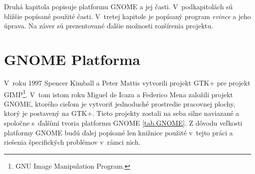\documentclass[12pt,oneside,final]{fithesis2}
\begin{document}
Druhá kapitola popisuje platformu GNOME a jej časti. V~podkapitolách sú bližšie popísané použité časti. V~tretej kapitole je popísaný program \emph{evince} a jeho úprava. Na záver sú prezentované ďalšie možnosti rozšírenia projektu.

\chapter{GNOME Platforma}
V~roku 1997 Spencer Kimball a Peter Mattis vytvorili projekt GTK+ pre projekt GIMP\footnote{GNU Image Manipulation Program.}. V~tom istom roku Miguel de Icaza a Federico Mena založili projekt GNOME, ktorého cieľom je vytvoriť jednoduché prostredie pracovnej plochy, ktorý je postavený na GTK+. Tieto projekty zostali na seba silne naviazané a spoločne s~ďalšími tvoria platformu GNOME \ref{tab.GNOME}. Z dôvodu veľkosti platformy GNOME budú ďalej popísané len knižnice použité v~tejto práci a riešenia špecifických problémov v~rámci nich.
\end{document}
